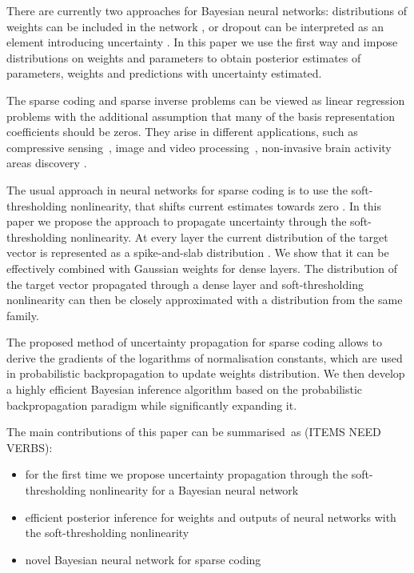 \documentclass[letterpaper]{article}
\begin{document}
There are currently two approaches for Bayesian neural networks: distributions of weights can be included in the network \citep{hernandez2015probabilistic, ranganath2015deep}, or dropout can be interpreted as an element introducing uncertainty \citep{gal2016dropout}. In this paper we use the first way and impose distributions on weights and parameters to obtain posterior estimates of parameters, weights and predictions with uncertainty estimated.

The sparse coding and sparse inverse problems can be viewed as linear regression problems with the additional assumption that many of the basis representation coefficients should be zeros. They arise in different applications, such as compressive sensing~\citep{candes2008introduction}, image and video processing~\citep{mairal2014sparse}, non-invasive brain activity areas discovery \citep{baillet1997bayesian, jas2017learning}. 

The usual approach in neural networks for sparse coding is to use the soft-thresholding nonlinearity, that shifts current estimates towards zero \citep{gregor2010learning}. In this paper we propose the approach to propagate uncertainty through the soft-thresholding nonlinearity. At every layer the current distribution of the target vector is represented as a spike-and-slab distribution \citep{mitchell1988bayesian}. We show that it can be effectively combined with Gaussian weights for dense layers. The distribution of the target vector propagated through a dense layer and soft-thresholding nonlinearity can then be closely approximated with a distribution from the same family.

The proposed method of uncertainty propagation for sparse coding allows to derive the gradients of the logarithms of normalisation constants, which are used in probabilistic backpropagation to update weights distribution. We then develop a highly efficient Bayesian inference algorithm based on the probabilistic backpropagation paradigm while significantly expanding it.

The main contributions of this paper can be summarised~as (ITEMS NEED VERBS): 
\begin{itemize}
\item for the first time we propose uncertainty propagation through the soft-thresholding nonlinearity for a Bayesian neural network
\item efficient posterior inference for weights and outputs of neural networks with the soft-thresholding nonlinearity
\item novel Bayesian neural network for sparse coding
\end{itemize}
\end{document}
